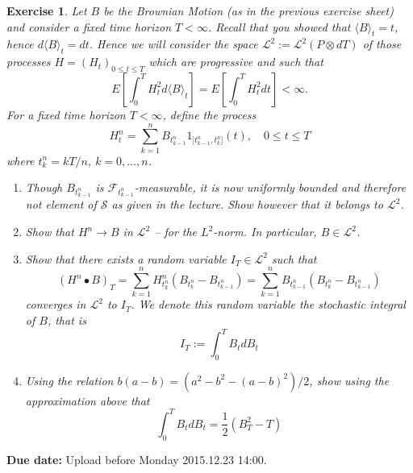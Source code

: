 \documentclass[DIV=classic,a4paper,10pt]{scrartcl}
\newtheorem{exercise}[theorem]{Exercise}
\theoremstyle{nonumberplain}
\numberwithin{equation}{section}
\begin{document}
\begin{exercise}
    Let $B$ be the Brownian Motion (as in the previous exercise sheet) and consider a fixed time horizon $T<\infty$.
    Recall that you showed that $\langle B\rangle_t=t$, hence $d\langle B\rangle_t=dt$.
    Hence we will consider the space $\mathcal{L}^2:=\mathcal{L}^2(P\otimes dT)$ of those processes $H=(H_t)_{0\leq t\leq T}$ which are progressive and such that
    \begin{equation*}
        E\left[ \int_{0}^{T}H_t^2 d\langle B\rangle_t  \right]=E\left[ \int_{0}^{T}H_t^2dt  \right]<\infty.
    \end{equation*}
    For a fixed time horizon $T<\infty$, define the process
    \begin{equation*}
        H^n_t=\sum_{k=1}^nB_{t_{k-1}^n}1_{]t_{k-1}^n,t_k^n]}(t), \quad 0\leq t\leq T
    \end{equation*}
    where $t_k^n=kT/n$, $k=0,\ldots, n$.
    \begin{enumerate}[label=\textit{(\roman*)}, fullwidth]
        \item Though $B_{t_{k-1}^n}$ is $\mathcal{F}_{t_{k-1}^n}$-measurable, it is now uniformly bounded and therefore not element of $\mathcal{S}$ as given in the lecture.
            Show however that it belongs to $\mathcal{L}^2$.
        \item Show that $H^n\to B$ in $\mathcal{L}^2$ -- for the $L^2$-norm.
            In particular, $B \in \mathcal{L}^2$.
        \item Show that there exists a random variable $I_T\in \mathcal{L}^2$ such that
            \begin{equation*}
                (H^n\bullet B)_T=\sum_{k=1}^nH^n_{t_k^n}\left( B_{t_k^n}-B_{t_{k-1}^n} \right)=\sum_{k=1}^nB_{t_{k-1}^n}\left( B_{t_{k}^n}-B_{t_{k-1}^n} \right)
            \end{equation*}
            converges in $\mathcal{L}^2$ to $I_T$.
            We denote this random variable the stochastic integral of $B$, that is
            \begin{equation*}
                I_T:=\int_{0}^{T}B_t dB_t 
            \end{equation*}
        \item Using the relation $b(a-b)=(a^2-b^2-(a-b)^2)/2$, show using the approximation above that
            \begin{equation*}
                \int_{0}^{T}B_tdB_t=\frac{1}{2}\left(B_T^2-T \right)
            \end{equation*}
    \end{enumerate}
\end{exercise}

\smallskip
\noindent
\textbf{Due date:} Upload before Monday 2015.12.23 14:00.
\end{document}
